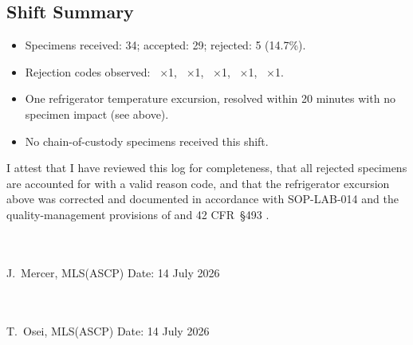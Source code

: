 \subsection{Shift Summary}
\begin{itemize}
  \item Specimens received: 34; accepted: 29; rejected: 5 (14.7\%).
  \item Rejection codes observed: ~$\times$1, ~$\times$1,
    ~$\times$1, ~$\times$1, ~$\times$1.
  \item One refrigerator temperature excursion, resolved within 20 minutes with no specimen
    impact (see above).
  \item No chain-of-custody specimens received this shift.
\end{itemize}

\vspace{6pt}
\begin{tcolorbox}[infobox,title={\faCheckSquare\ Reviewing Supervisor Attestation}]
I attest that I have reviewed this log for completeness, that all rejected specimens are
accounted for with a valid reason code, and that the refrigerator excursion above was
corrected and documented in accordance with SOP-LAB-014 and the quality-management provisions
of \citet{iso15189} and 42 CFR~\S 493 \citep{clia_493}.
\end{tcolorbox}

\vspace{8pt}
\noindent
\begin{minipage}[t]{0.48\linewidth}
\\[14pt]
\hrulefill\\
\footnotesize J.\ Mercer, MLS(ASCP) \hfill Date: 14 July 2026
\end{minipage}\hfill
\begin{minipage}[t]{0.48\linewidth}
\\[14pt]
\hrulefill\\
\footnotesize T.\ Osei, MLS(ASCP) \hfill Date: 14 July 2026
\end{minipage}
\par

\vspace{8pt}
\begingroup
\small
\setlength{\bibsep}{3pt}


\endgroup
